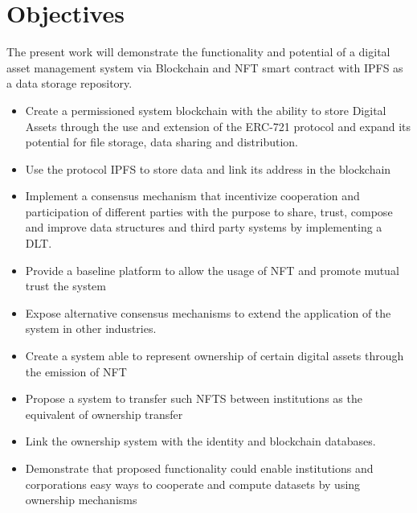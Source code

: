 \section{Objectives}
The present work will demonstrate the functionality and potential of a digital asset management system via Blockchain and \ac{NFT} smart contract with \ac{IPFS} as a data storage repository.
\begin{itemize}
    \item Create a permissioned system blockchain with the ability to store Digital Assets through the use and extension of the \ac{ERC}-721 protocol and expand its potential for file storage, data sharing and distribution.
    \item Use the protocol \ac{IPFS} to store data and link its address in the blockchain
    \item Implement a consensus mechanism that incentivize cooperation and participation of different parties with the purpose to share, trust, compose and improve data structures and third party systems by implementing a \ac{DLT}.
    \item Provide a baseline platform to allow the usage of \ac{NFT} and promote mutual trust the system
    \item Expose alternative consensus mechanisms to extend the application of the system in other industries.
    \item Create a system able to represent ownership of certain digital assets through the emission of \ac{NFT}
\item Propose a system to transfer such \ac{NFT}S between institutions as the equivalent of ownership transfer
\item Link the ownership system with the identity and blockchain databases.
\item Demonstrate that proposed functionality could enable institutions and corporations easy ways to cooperate and compute datasets by using ownership mechanisms
\end{itemize}